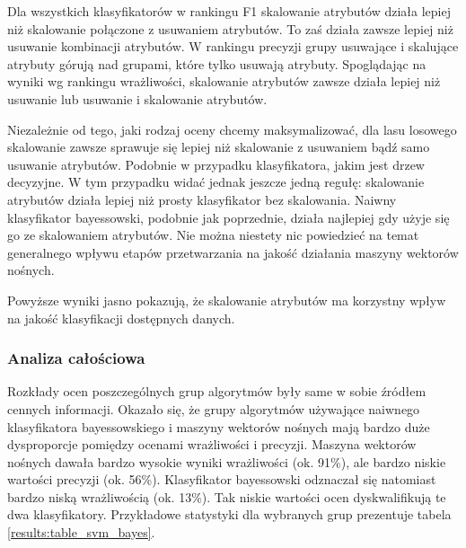 \documentclass[../thesis.tex]{subfiles}
\begin{document}
Dla wszystkich klasyfikatorów w rankingu F1 skalowanie atrybutów działa lepiej niż skalowanie połączone z usuwaniem atrybutów. To zaś działa zawsze lepiej niż usuwanie kombinacji atrybutów. W rankingu precyzji grupy usuwające i skalujące atrybuty górują nad grupami, które tylko usuwają atrybuty. Spoglądając na wyniki wg rankingu wrażliwości, skalowanie atrybutów zawsze działa lepiej niż usuwanie lub usuwanie i skalowanie atrybutów.

Niezależnie od tego, jaki rodzaj oceny chcemy maksymalizować, dla lasu losowego skalowanie zawsze sprawuje się lepiej niż skalowanie z usuwaniem bądź samo usuwanie atrybutów. Podobnie w przypadku klasyfikatora, jakim jest drzew decyzyjne. W tym przypadku widać jednak jeszcze jedną regułę: skalowanie atrybutów działa lepiej niż prosty klasyfikator bez skalowania. Naiwny klasyfikator bayessowski, podobnie jak poprzednie, działa najlepiej gdy użyje się go ze skalowaniem atrybutów. Nie można niestety nic powiedzieć na temat generalnego wpływu etapów przetwarzania na jakość działania maszyny wektorów nośnych.

Powyższe wyniki jasno pokazują, że skalowanie atrybutów ma korzystny wpływ na jakość klasyfikacji dostępnych danych.

\subsubsection{Analiza całościowa}

Rozkłady ocen poszczególnych grup algorytmów były same w sobie źródłem cennych informacji. Okazało się, że grupy algorytmów używające naiwnego klasyfikatora bayessowskiego i maszyny wektorów nośnych mają bardzo duże dysproporcje pomiędzy ocenami wrażliwości i precyzji. Maszyna wektorów nośnych dawała bardzo wysokie wyniki wrażliwości (ok. 91\%), ale bardzo niskie wartości precyzji (ok. 56\%). Klasyfikator bayessowski odznaczał się natomiast bardzo niską wrażliwością (ok. 13\%). Tak niskie wartości ocen dyskwalifikują te dwa klasyfikatory. Przykładowe statystyki dla wybranych grup prezentuje tabela \ref{results:table_svm_bayes}.
\end{document}
